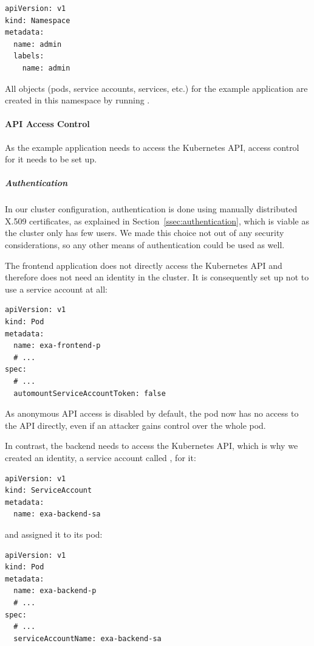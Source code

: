 \begin{verbatim}
apiVersion: v1
kind: Namespace
metadata:
  name: admin
  labels:
    name: admin
\end{verbatim}

All objects (pods, service accounts, services, etc.) for the example application are created in this namespace by running .

\paragraph{API Access Control}

As the example application needs to access the Kubernetes API, access control for it needs to be set up.

\subparagraph{Authentication}
In our cluster configuration, authentication is done using manually distributed X.509 certificates, as explained in Section~\ref{ssec:authentication}, which is viable as the cluster only has few users. We made this choice not out of any security considerations, so any other means of authentication could be used as well. 

The frontend application does not directly access the Kubernetes API and therefore does not need an identity in the cluster. It is consequently set up not to use a service account at all:

\begin{verbatim}
apiVersion: v1
kind: Pod
metadata:
  name: exa-frontend-p
  # ...
spec:
  # ...
  automountServiceAccountToken: false
\end{verbatim}

As anonymous API access is disabled by default, the pod  now has no access to the API directly, even if an attacker gains control over the whole pod.

In contrast, the backend needs to access the Kubernetes API, which is why we created an identity, a service account called , for it:

\begin{verbatim}
apiVersion: v1
kind: ServiceAccount
metadata:
  name: exa-backend-sa
\end{verbatim}

and assigned it to its pod:

\begin{verbatim}
apiVersion: v1
kind: Pod
metadata:
  name: exa-backend-p
  # ...
spec:
  # ...
  serviceAccountName: exa-backend-sa
\end{verbatim}

